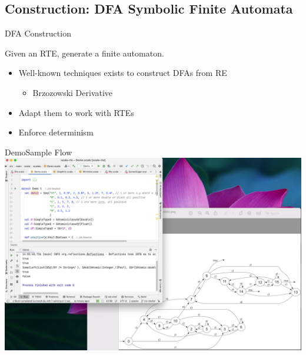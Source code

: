 \subsection{Construction: DFA Symbolic Finite Automata}

{  
\begin{frame}{ DFA Construction}

  Given an RTE, generate a finite automaton.

  \begin{itemize}
  \item Well-known techniques exists to construct DFAs from RE
    \begin{itemize}
      \item Brzozowski Derivative
  \end{itemize}
  \item Adapt them to work with RTEs
  \item Enforce determinism
  \end{itemize}
\end{frame}
}








\begin{frame}{Demo}{Sample Flow}
  \centering
   \includegraphics[height=0.8\textheight]{demo.png}
\end{frame}


